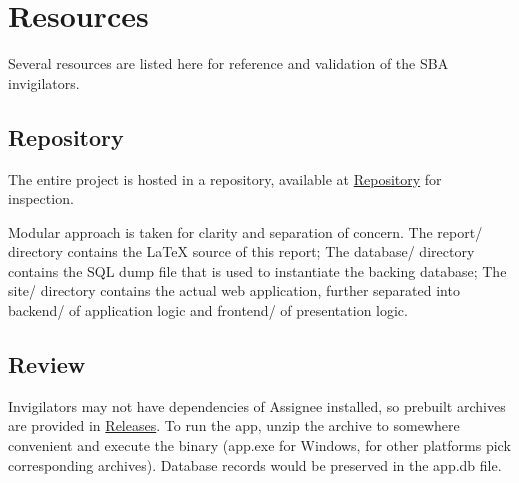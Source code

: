 \section{Resources}
\label{overview.src}

Several resources are listed here for reference and validation of the SBA invigilators.

\subsection{Repository}
\label{overview.src.repo}

The entire project is hosted in a repository, available at \href{https://github.com/CarbonicSoda/assignee}{Repository}
for inspection.

Modular approach is taken for clarity and separation of concern. The report/ directory
contains the \LaTeX{} source of this report; The database/ directory contains
the SQL dump file that is used to instantiate the backing database; The site/
directory contains the actual web application, further separated into backend/
of application logic and frontend/ of presentation logic.

\subsection{Review}
\label{overview.src.review}

Invigilators may not have dependencies of Assignee installed, so prebuilt archives
are provided in \href{https://github.com/CarbonicSoda/assignee/releases}{Releases}.
To run the app, unzip the archive to somewhere convenient and execute the binary
(app.exe for Windows, for other platforms pick corresponding archives). Database
records would be preserved in the app.db file.